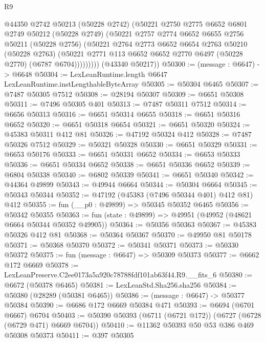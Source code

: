 \begin{lexlean}{R9}
\begin{coremodule}
              @44350
              @2742
              @50213
              (@50228 @2742)
              (@50221
                @2750
                @2775
                @6652
                @6801
                @2749
                @50212
                (@50228 @2749)
                (@50221
                  @2757
                  @2774
                  @6652
                  @6655
                  @2756
                  @50211
                  (@50228 @2756)
                  (@50221
                    @2764
                    @2773
                    @6652
                    @6654
                    @2763
                    @50210
                    (@50228 @2763)
                    (@50221 @2771 @113 @6652 @6652 @2770 @6497 (@50228 @2770) (@6787 @6704)))))))))
      (@43340 @50217))
@50300 := (message : @6647) -> @6648
@50304 := LexLeanRuntime.length @6647 LexLeanRuntime.instLengthableByteArray
@50305 := @50304 @6465
@50307 := @7487 @50305 @7512
@50308 := @28194 @50307
@50309 := @6651 @50308
@50311 := @7496 @50305 @401
@50313 := @7487 @50311 @7512
@50314 := @6656 @50313
@50316 := @6651 @50314 @6655
@50318 := @6651 @50316 @6652
@50320 := @6651 @50318 @6654
@50321 := @6651 @50320
@50324 := @45383 @50311 @412 @81
@50326 := @47192 @50324 @412
@50328 := @7487 @50326 @7512
@50329 := @50321 @50328
@50330 := @6651 @50329
@50331 := @6653 @50176
@50333 := @6651 @50331 @6652
@50334 := @6653 @50333
@50336 := @6651 @50334 @6652
@50338 := @6651 @50336 @6652
@50339 := @6804 @50338
@50340 := @6802 @50339
@50341 := @6651 @50340
@50342 := @44364 @49899
@50343 := @49944 @6664
@50344 := @50304 @6664
@50345 := @50343 @50344
@50352 := @47192 (@45383 (@7496 @50344 @401) @412 @81) @412
@50355 := fun (__p0 : @49899) => @50345 @50352 @6465
@50356 := @50342 @50355
@50363 := fun (state : @49899) => @49951 (@49952 (@48621 @6664 @50344 @50352 @49905))
@50364 := @50356 @50363
@50367 := @45383 @50326 @412 @81
@50368 := @50364 @50367
@50370 := @49950 @81 @50178
@50371 := @50368 @50370
@50372 := @50341 @50371
@50373 := @50330 @50372
@50375 := fun (message : @6647) => @50309 @50373
@50377 := @6662 @172 @6669
@50378 := LexLeanPreserve.C2ee0173a5a920c78788fdf101ab63f44.R9.__fits_6
@50380 := @6672 (@50378 @6465)
@50381 := LexLeanStd.Sha256.sha256
@50384 := @50380 (@28289 (@50381 @6465))
@50386 := (message : @6647) -> @50377 @50384
@50390 := @6686 @172 @6669 @50384 @471
@50393 := @6694 (@6701 @6667) @6704
@50403 := @50390 @50393 (@6711 (@6721 @172)) (@6727 (@6728 (@6729 @471) @6669 @6704))
@50410 := @11362 @50393 @50 @53 @386 @469 @50308 @50373
@50411 := @397 @50305

\end{coremodule}
\end{lexlean}
